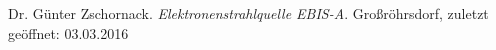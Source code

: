 \begin{thebibliography}{99}
 Dr. Günter Zschornack. \textit{Elektronenstrahlquelle EBIS-A}. Großröhrsdorf, zuletzt geöffnet: 03.03.2016
\end{thebibliography}